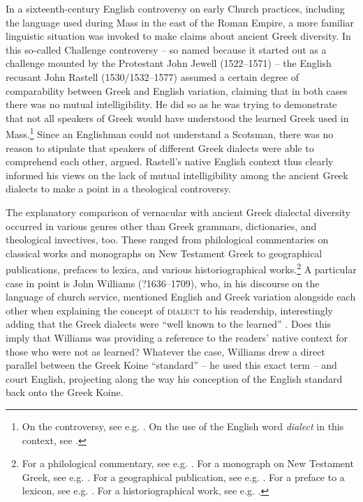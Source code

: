 In a sixteenth-century English controversy on early Church practices, including the language used during Mass in the east of the Roman Empire, a more familiar linguistic situation was invoked to make claims about ancient Greek diversity. In this so-called Challenge controversy – so named because it started out as a challenge mounted by the Protestant John Jewell (1522–1571) – the English recusant John Rastell (1530/1532–1577) assumed a certain degree of comparability between Greek and English variation, claiming that in both cases there was no mutual intelligibility. He did so as he was trying to demonstrate that not all speakers of Greek would have understood the learned Greek used in Mass.\footnote{On the controversy, see e.g. \citet[115--154]{Jenkins2006}. On the use of the English word \textit{dialect} in this context, see \citet[647--651]{VanRooyConsidine2016}.} Since an Englishman could not understand a Scotsman, there was no reason to stipulate that speakers of different Greek dialects were able to comprehend each other, \citet[68\textsc{\textsuperscript{r}}]{Rastell1566} argued. Rastell’s native English context thus clearly informed his views on the lack of mutual intelligibility among the ancient Greek dialects to make a point in a theological controversy.

The explanatory comparison of vernacular with ancient Greek dialectal diversity occurred in various genres other than Greek grammars, dictionaries, and theological invectives, too. These ranged from philological commentaries on classical works and monographs on New Testament Greek to geographical publications, prefaces to lexica, and various historiographical works.\footnote{For a philological commentary, see e.g. \citet[68; French–Greek comparison]{Casaubon1587}. For a monograph on New Testament Greek, see e.g. \citet[212--213; also French-Greek]{Cottiere1646}. For a geographical publication, see e.g. \citet[60; English–Greek comparison]{Speed1676}. For a preface to a lexicon, see e.g. \citet[(b.3)\textsuperscript{v}\textsc{;} also English–Greek]{Phillips1658}. For a historiographical work, see e.g. \citet[108, 117; French/Italian–Greek comparison]{Freret1809}.} A particular case in point is John Williams (?1636–1709), who, in his discourse on the language of church service, mentioned English and Greek variation alongside each other when explaining the concept of \textsc{dialect} to his readership, interestingly adding that the Greek dialects were “well known to the learned” \citep[5]{Williams1685}. Does this imply that Williams was providing a reference to the readers’ native context for those who were not as learned? Whatever the case, Williams drew a direct parallel between the Greek Koine “standard” – he used this exact term – and court English, projecting along the way his conception of the English standard back onto the Greek Koine.

